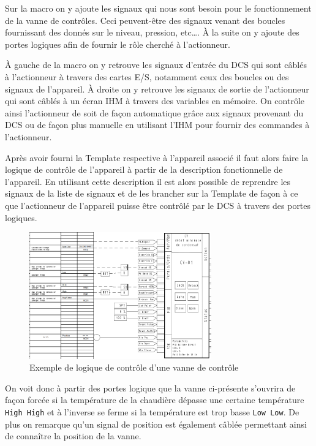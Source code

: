 \documentclass[11pt, openright]{book}
\begin{document}
Sur la macro on y ajoute les signaux qui nous sont besoin pour le fonctionnement de la vanne de contrôles. Ceci peuvent-être des signaux venant des boucles fournissant des donnés sur le niveau, pression, etc\dots. À la suite on y ajoute des portes logiques afin de fournir le rôle cherché à l'actionneur.

À gauche de la macro on y retrouve les signaux d'entrée du DCS qui sont câblés à l'actionneur à travers des cartes E/S, notamment ceux des boucles ou des signaux de l'appareil. À droite on y retrouve les signaux de sortie de l'actionneur qui sont câblés à un écran IHM à travers des variables en mémoire. On contrôle ainsi l'actionneur de soit de façon automatique grâce aux signaux provenant du DCS ou de façon plus manuelle en utilisant l'IHM pour fournir des commandes à l'actionneur.

Après avoir fourni la Template respective à l'appareil associé il faut alors faire la logique de contrôle de l'appareil à partir de la description fonctionnelle de l'appareil.
En utilisant cette description il est alors possible de reprendre les signaux de la liste de signaux et de les brancher sur la Template de façon à ce que l'actionneur de l'appareil puisse être contrôlé par le DCS à travers des portes logiques.


\newpage
\begin{figure}[ht!]
    \centering
    \includegraphics[width=0.7\textwidth]{./object/CV.png}
    \caption{Exemple de logique de contrôle d'une vanne de contrôle}
\end{figure}

On voit donc à partir des portes logique que la vanne ci-présente s'ouvrira de façon forcée si la température de la chaudière dépasse une certaine température \texttt{High High} et à l'inverse se ferme si la température est trop basse \texttt{Low Low}. De plus on remarque qu'un signal de position est également câblée permettant ainsi de connaître la position de la vanne.
\end{document}
